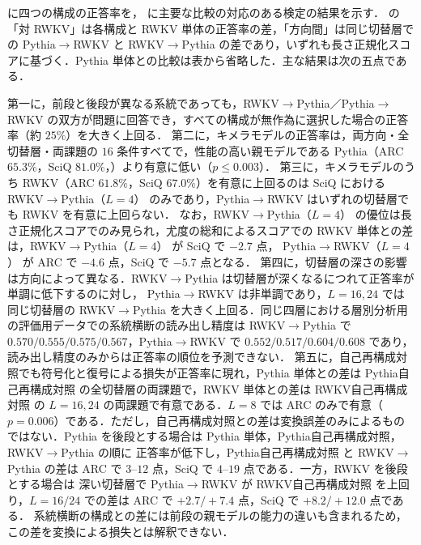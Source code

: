 \documentclass[techrep,noauthor]{ipsj}
\newcommand{\RWKVself}{RWKV自己再構成対照}
\newcommand{\Pythiaself}{Pythia自己再構成対照}
\newcommand{\RtoP}{RWKV$\to$\allowbreak Pythia}
\newcommand{\PtoR}{Pythia$\to$\allowbreak RWKV}
\newcommand{\RtoPL}[1]{\RtoP{}（$L{=}#1$）}
\newcommand{\PtoRL}[1]{\PtoR{}（$L{=}#1$）}
\begin{document}
 に四つの構成の正答率を， に主要な比較の対応のある検定の結果を示す． の「対 RWKV」は各構成と RWKV 単体の正答率の差，「方向間」は同じ切替層での \PtoR{} と \RtoP{} の差であり，いずれも長さ正規化スコアに基づく．Pythia 単体との比較は表から省略した．主な結果は次の五点である．

第一に，前段と後段が異なる系統であっても，\RtoP{}／\PtoR{} の双方が問題に回答でき，すべての構成が無作為に選択した場合の正答率（約 $25\%$）を大きく上回る．
第二に，キメラモデルの正答率は，両方向・全切替層・両課題の $16$ 条件すべてで，性能の高い親モデルである Pythia（ARC $65.3\%$，SciQ $81.0\%$，）より有意に低い（$p\le0.003$）．
第三に，キメラモデルのうち RWKV（ARC $61.8\%$，SciQ $67.0\%$）を有意に上回るのは SciQ における \RtoPL{4} のみであり，\PtoR{} はいずれの切替層でも RWKV を有意に上回らない．
なお，\RtoPL{4} の優位は長さ正規化スコアでのみ見られ，尤度の総和によるスコアでの RWKV 単体との差は，\RtoPL{4} が SciQ で $-2.7$ 点，
\PtoRL{4} が ARC で $-4.6$ 点，SciQ で $-5.7$ 点となる．
第四に，切替層の深さの影響は方向によって異なる．\RtoP{} は切替層が深くなるにつれて正答率が単調に低下するのに対し，
\PtoR{} は非単調であり，$L{=}16,24$ では同じ切替層の \RtoP{} を大きく上回る．同じ四層における層別分析用の評価用データでの系統横断の読み出し精度は
\RtoP{} で $0.570/0.555/0.575/0.567$，\PtoR{} で $0.552/0.517/0.604/0.608$ であり，読み出し精度のみからは正答率の順位を予測できない．
第五に，自己再構成対照でも符号化と復号による損失が正答率に現れ，Pythia 単体との差は \Pythiaself{} の全切替層の両課題で，RWKV 単体との差は \RWKVself{} の $L{=}16,24$ の両課題で有意である．$L{=}8$ では ARC のみで有意（$p{=}0.006$）である．ただし，自己再構成対照との差は変換誤差のみによるものではない．Pythia を後段とする場合は Pythia 単体，\Pythiaself{}，\RtoP{} の順に
正答率が低下し，\Pythiaself{} と \RtoP{} の差は ARC で $3$--$12$ 点，SciQ で $4$--$19$ 点である．一方，RWKV を後段とする場合は
深い切替層で \PtoR{} が \RWKVself{} を上回り，$L{=}16/24$ での差は ARC で $+2.7/+7.4$ 点，SciQ で $+8.2/+12.0$ 点である．
系統横断の構成との差には前段の親モデルの能力の違いも含まれるため，この差を変換による損失とは解釈できない．
\end{document}
